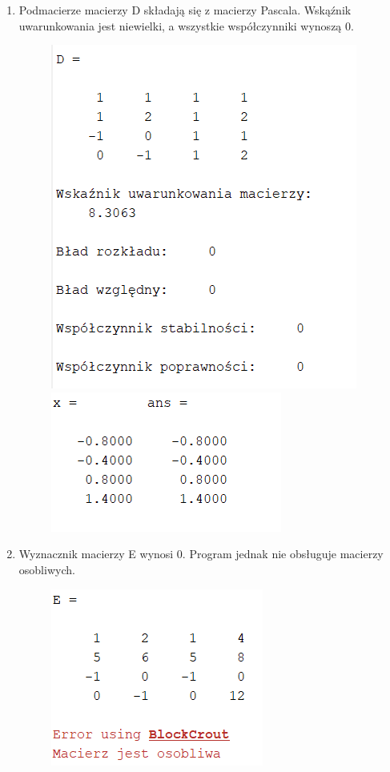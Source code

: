 \documentclass[11pt]{article}
\begin{document}
\begin{enumerate}
    \item Podmacierze macierzy D składają się z macierzy Pascala. Wskąźnik uwarunkowania jest niewielki, a wszystkie współczynniki wynoszą 0.
    \begin{figure}[h]
        \centering
        \includegraphics[scale=0.8]{D1}
        \includegraphics[scale=0.9]{D2}
    \end{figure}


    \item Wyznacznik macierzy E wynosi 0. Program jednak nie obsługuje macierzy osobliwych.
    \begin{figure}[h]
        \centering
        \includegraphics[scale=0.8]{E1}
    \end{figure}


\end{enumerate}
\end{document}
